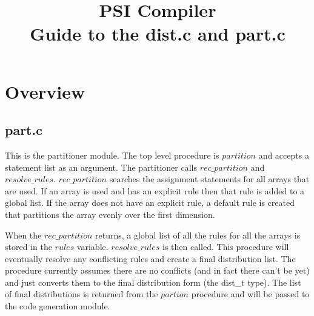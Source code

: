 
\addtolength{\topmargin}{-.75in}
\addtolength{\textwidth}{1.6in}
\setlength{\textheight}{8.75in}
\addtolength{\oddsidemargin}{-0.75in}
\addtolength{\evensidemargin}{-0.75in}
\setlength{\parskip}{.1in}

\newcommand{\cat}{+\!\!\!\!+}
\newcommand{\take}{\,\bigtriangleup\,}
\newcommand{\drop}{\,\bigtriangledown\,}
\newcommand{\karate}{\!\widehat{\hbox to 10pt{}}\!}
\newcommand{\rshp}{\widehat{\rho}}

\title{PSI Compiler\\Guide to the dist.c and part.c}
\author{}


\maketitle
\tableofcontents

\section{Overview}

\subsection{part.c}
This is the partitioner module.  The top level procedure is $partition$
and accepts a statement list as an argument.  The partitioner calls
$rec\_partition$ and $resolve\_rules$.  $rec\_partition$ searches the
assignment statements for all arrays that are used.  If an array
is used and has an explicit rule then that rule is added to a global
list.  If the array does not have an explicit rule, a default rule
is created that partitions the array evenly over the first dimension.

When the $rec\_partition$ returns, a global list of all the rules for
all the arrays is stored in the $rules$ variable.  $resolve\_rules$
is then called.  This procedure will eventually resolve any conflicting
rules and create a final distribution list.  The procedure currently assumes
there are no conflicts (and in fact there can't be yet) and just converts
them to the final distribution form (the dist\_t type).  The list
of final distributions is returned from the $partion$ procedure and
will be passed to the code generation module.

